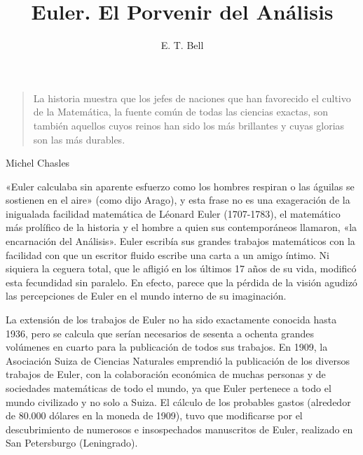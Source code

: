 \documentclass[a4paper, 12pt]{article}
\title{Euler. El Porvenir del Análisis}
\author{E. T. Bell}
\date{}
\begin{document}
\begin{tcolorbox}[colback=blue!5!white,colframe=blue!75!black]

\vspace{-1.8cm}
\textbf \maketitle

\end{tcolorbox}

\bigskip





\begin{quote}\it

	La historia muestra que los jefes de naciones que han favorecido el cultivo de la Matemática, la fuente común de todas las ciencias exactas, son también aquellos cuyos reinos han sido los más brillantes y cuyas glorias son las más durables.

\end{quote}

\hfill Michel Chasles


\bigskip

«Euler calculaba sin aparente esfuerzo como los hombres respiran o las águilas se sostienen en el aire» (como dijo Arago), y esta frase no es una exageración de la inigualada facilidad matemática de Léonard Euler (1707-1783), el matemático más prolífico de la historia y el hombre a quien sus contemporáneos llamaron, «la encarnación del Análisis». Euler escribía sus grandes trabajos matemáticos con la facilidad con que un escritor fluido escribe una carta a un amigo íntimo. Ni siquiera la ceguera total, que le afligió en los últimos 17 años de su vida, modificó esta fecundidad sin paralelo. En efecto, parece que la pérdida de la visión agudizó las percepciones de Euler en el mundo interno de su imaginación.

La extensión de los trabajos de Euler no ha sido exactamente conocida hasta 1936, pero se calcula que serían necesarios de sesenta a ochenta grandes volúmenes en cuarto para la publicación de todos sus trabajos. En 1909, la Asociación Suiza de Ciencias Naturales emprendió la publicación de los diversos trabajos de Euler, con la colaboración económica de muchas personas y de sociedades matemáticas de todo el mundo, ya que Euler pertenece a todo el mundo civilizado y no solo a Suiza. El cálculo de los probables gastos (alrededor de 80.000 dólares en la moneda de 1909), tuvo que modificarse por el descubrimiento de numerosos e insospechados manuscritos de Euler, realizado en San Petersburgo (Leningrado).
\end{document}
